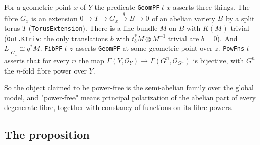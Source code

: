 \documentclass[11pt]{article}
\newcommand{\lean}[1]{\nolinkurl{#1}}
\theoremstyle{remark}
\begin{document}
For a geometric point $x$ of $Y$ the predicate \lean{GeomPF} $t$ $x$ asserts three things. The fibre $G_x$ is an extension $0\to T\to G_x\xrightarrow{q}B\to 0$ of an abelian variety $B$ by a split torus $T$ (\lean{TorusExtension}). There is a line bundle $M$ on $B$ with $K(M)$ trivial (\lean{Out.KTriv}: the only translations $b$ with $t_b^*M\otimes M^{-1}$ trivial are $b=0$). And $L|_{G_x}\cong q^*M$. \lean{FibPF} $t$ $z$ asserts \lean{GeomPF} at some geometric point over $z$. \lean{PowFns} $t$ asserts that for every $n$ the map $\Gamma(Y,\mathcal O_Y)\to\Gamma(G^n,\mathcal O_{G^n})$ is bijective, with $G^n$ the $n$-fold fibre power over $Y$.

So the object claimed to be power-free is the semi-abelian family over the global model, and "power-free" means principal polarization of the abelian part of every degenerate fibre, together with constancy of functions on its fibre powers.

\subsection{The proposition}
\end{document}

